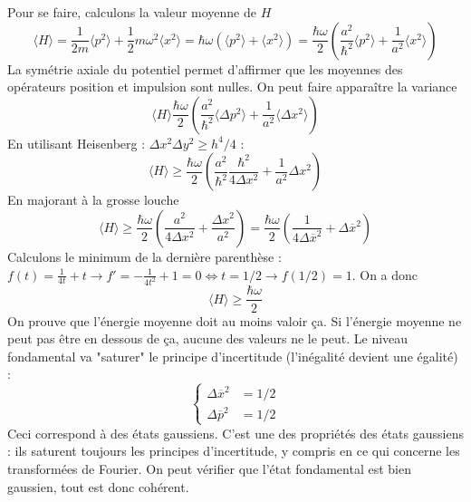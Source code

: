 		Pour se faire, calculons la valeur moyenne de $H$
		\begin{equation}
		\langle H\rangle = \frac{1}{2m}\langle p^2\rangle + \frac{1}{2}m\omega^2\langle x^2\rangle = 
		\hbar\omega\left(\langle p^2\rangle+\langle x^2\rangle\right) = \frac{\hbar\omega}{2}\left(\frac{a^2}{
		\hbar^2}\langle p^2\rangle+\frac{1}{a^2}\langle x^2\rangle\right)
		\end{equation}
		La symétrie axiale du potentiel permet d'affirmer que les moyennes des opérateurs
		position et impulsion sont nulles.
		On peut faire apparaître la variance%
		\begin{equation}
		\langle H\rangle \dfrac{\hbar\omega}{2}\left(\frac{a^2}{\hbar^2}\langle\Delta p^2\rangle +\frac{1}
		{a^2}\langle\Delta 		x^2\rangle\right)
		\end{equation}
		En utilisant Heisenberg : $\Delta x^2\Delta y^2 \geq h^4/4$ :
		\begin{equation}
		\langle H\rangle \geq \dfrac{\hbar\omega}{2}\left(\dfrac{a^2}{\hbar^2}\dfrac{\hbar^2}{4\Delta x^2}
		+\frac{1}{a^2}\Delta x^2\right)
		\end{equation}
		En majorant à la grosse louche
		\begin{equation}
		\langle H\rangle \geq \dfrac{\hbar\omega}{2}\left(\frac{a^2}{4\Delta x^2}+\frac{\Delta x^2}{a^2}\right) 
		= \frac{\hbar\omega}{2}\left(\frac{1}{4\Delta \overline{x}^2}+\Delta \overline{x}^2\right)
		\end{equation}
		Calculons le minimum de la dernière parenthèse : $f(t) = \frac{1}{4t}+t \rightarrow f' = -\frac{1}{4t^2}
		+1 =0\Leftrightarrow t = 1/2 \rightarrow f(1/2)=1$. On a donc
		\begin{equation}
		\langle H\rangle \geq\dfrac{\hbar\omega}{2}
		\end{equation}		
		On prouve que l'énergie moyenne doit au moins valoir ça. Si l'énergie moyenne ne peut pas 
		être en dessous de ça, aucune des valeurs ne le peut. Le niveau fondamental va "saturer" le 
		principe d'incertitude (l’inégalité devient une égalité) :
		\begin{equation}
		\left\{\begin{array}{ll}
		\Delta \overline{x}^2 &= 1/2\\
		\Delta \overline{p}^2 &= 1/2		
		\end{array}\right.
		\end{equation}
		Ceci correspond à des états gaussiens. %
		C'est une des propriétés des états gaussiens : ils saturent toujours les principes
		d'incertitude, y compris en ce qui concerne les transformées de Fourier.
		 On peut vérifier
		que l'état fondamental est bien gaussien, tout est donc cohérent.
	

